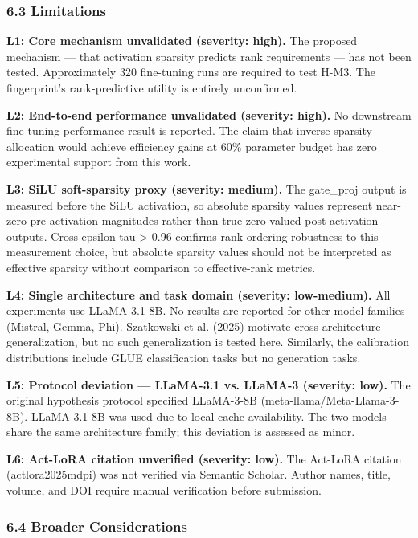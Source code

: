 \subsubsection{6.3 Limitations}

\textbf{L1: Core mechanism unvalidated (severity: high).} The proposed mechanism --- that activation sparsity predicts rank requirements --- has not been tested. Approximately 320 fine-tuning runs are required to test H-M3. The fingerprint's rank-predictive utility is entirely unconfirmed.

\textbf{L2: End-to-end performance unvalidated (severity: high).} No downstream fine-tuning performance result is reported. The claim that inverse-sparsity allocation would achieve efficiency gains at 60\% parameter budget has zero experimental support from this work.

\textbf{L3: SiLU soft-sparsity proxy (severity: medium).} The gate\_proj output is measured before the SiLU activation, so absolute sparsity values represent near-zero pre-activation magnitudes rather than true zero-valued post-activation outputs. Cross-epsilon tau > 0.96 confirms rank ordering robustness to this measurement choice, but absolute sparsity values should not be interpreted as effective sparsity without comparison to effective-rank metrics.

\textbf{L4: Single architecture and task domain (severity: low-medium).} All experiments use LLaMA-3.1-8B. No results are reported for other model families (Mistral, Gemma, Phi). Szatkowski et al. (2025) motivate cross-architecture generalization, but no such generalization is tested here. Similarly, the calibration distributions include GLUE classification tasks but no generation tasks.

\textbf{L5: Protocol deviation --- LLaMA-3.1 vs. LLaMA-3 (severity: low).} The original hypothesis protocol specified LLaMA-3-8B (meta-llama/Meta-Llama-3-8B). LLaMA-3.1-8B was used due to local cache availability. The two models share the same architecture family; this deviation is assessed as minor.

\textbf{L6: Act-LoRA citation unverified (severity: low).} The Act-LoRA citation (actlora2025mdpi) was not verified via Semantic Scholar. Author names, title, volume, and DOI require manual verification before submission.

\subsubsection{6.4 Broader Considerations}


